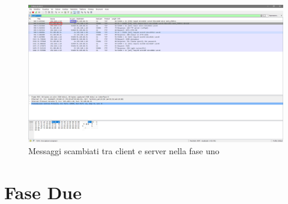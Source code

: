 \documentclass[a4paper, 12pt]{report}
\begin{document}
\begin{figure}[H]
	\centering
	\includegraphics[width=\linewidth]{images/image2_1.png}
	\caption{Messaggi scambiati tra client e server nella fase uno}
\end{figure}

\section{Fase Due}
\end{document}
